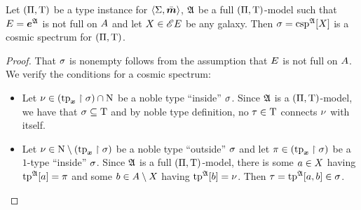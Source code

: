 \begin{remark}
Let $(\Pi,\mathrm{T})$ be a type instance for $\left\langle \mathrm{\Sigma},\bar{\bm{m}} \right\rangle$, $\mathfrak{A}$ be a full
$(\Pi,\mathrm{T})$-model such that $E = \bm{e}^{\mathfrak{A}}$ is not full on $A$
and let $X \in {\mathscr{E}E}$ be any galaxy.
Then $\sigma = \operatorname{csp}^{\mathfrak{A}}[X]$ is a cosmic spectrum for $(\Pi,\mathrm{T})$.
\end{remark}
\begin{proof}
That $\sigma$ is nonempty follows from the assumption that $E$ is not full on
$A$. We verify the conditions for a cosmic spectrum:
\begin{itemize}
  \item[\refcspcondIIp]
   Let $\nu \in (\operatorname{tp}_{\bm{x}}\restriction\sigma) \cap \mathrm{\mathrm{N}}$ be a noble type ``inside''
   $\sigma$. Since $\mathfrak{A}$ is a $(\Pi,\mathrm{T})$-model, we have that $\sigma
   \subseteq \mathrm{T}$ and by noble type definition, no $\tau \in \mathrm{T}$
   connects $\nu$ with itself.
   \item[\refcspcondIIIp]
   Let $\nu \in \mathrm{\mathrm{N}} \setminus (\operatorname{tp}_{\bm{x}}\restriction\sigma)$ be a noble type ``outside''
   $\sigma$ and let $\pi \in (\operatorname{tp}_{\bm{x}}\restriction\sigma)$ be a $1$-type ``inside''
   $\sigma$.
   Since $\mathfrak{A}$ is a full $(\Pi,\mathrm{T})$-model, there is some
   $a \in X$ having $\operatorname{tp}^{\mathfrak{A}}[a] = \pi$ and some
   $b \in A \setminus X$ having $\operatorname{tp}^{\mathfrak{A}}[b] = \nu$.
   Then $\tau = \operatorname{tp}^{\mathfrak{A}}[a,b] \in \sigma$.
\end{itemize}
\end{proof}

